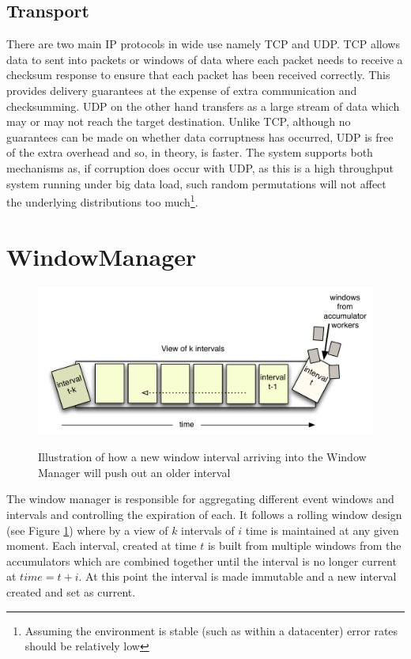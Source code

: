 \documentclass[a4paper,11pt]{scrreprt}
\begin{document}
\subsection{Transport}
There are two main IP protocols in wide use namely TCP and UDP. TCP allows data to sent into packets or windows of data where each packet needs to receive a checksum response to ensure that each packet has been received correctly. This provides delivery guarantees at the expense of extra communication and checksumming. UDP on the other hand transfers as a large stream of data which may or may not reach the target destination. Unlike TCP, although no guarantees can be made on whether data corruptness has occurred, UDP is free of the extra overhead and so, in theory, is faster. The system supports both mechanisms as, if corruption does occur with UDP, as this is a high throughput system running under big data load, such random permutations will not affect the underlying distributions too much\footnote{Assuming the environment is stable (such as within a datacenter) error rates should be relatively low}.
\section{WindowManager}
\begin{figure}[h!]
\centering
\caption{Illustration of how a new window interval arriving into the Window Manager will push out an older interval}
\includegraphics[scale=0.72, trim=0 0 0 12, clip=true] {window.pdf}
\label{fig:rollingwindow}
\end{figure}
The window manager is responsible for aggregating different event windows and intervals and controlling the expiration of each. It follows a rolling window design (see Figure \ref{fig:rollingwindow}) where by a view of \(k\) intervals of \(i\) time is maintained at any given moment. Each interval, created at time \(t\) is built from multiple windows from the accumulators which are combined together until the interval is no longer current at \(time = t+i\). At this point the interval is made immutable and a new interval created and set as current. 
\end{document}
